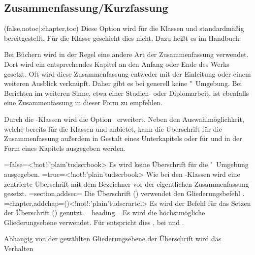 \begin{DeclareEntity*}{}
\begin{DeclareEntity*}{}
\begin{DeclareEntity*}{}
\subsection{%
  Zusammenfassung/Kurzfassung%
}
%
\begin{Declaration}
  {}
  (false,notoc|:chapter,toc)
Diese Option wird für die Klassen  und  
standardmäßig bereitgestellt. Für die Klasse  geschieht dies 
nicht. Dazu heißt es im Handbuch:
%
\begin{quoting}
Bei Büchern wird in der Regel eine andere Art der Zusammenfassung verwendet. 
Dort wird ein entsprechendes Kapitel an den Anfang oder Ende des Werks gesetzt. 
Oft wird diese Zusammenfassung entweder mit der Einleitung oder einem weiteren 
Ausblick verknüpft. Daher gibt es bei  generell keine 
"~Umgebung. Bei Berichten im weiteren Sinne, etwa einer 
Studien- oder Diplomarbeit, ist ebenfalls eine Zusammenfassung in dieser Form 
zu empfehlen.
\end{quoting}
%
Durch die \TUDScript-Klassen wird die Option~ erweitert. 
Neben den Auswahlmöglichkeit, welche bereits \KOMAScript für die Klassen 
 und  anbietet, kann die Überschrift für 
die Zusammenfassung außerdem in Gestalt eines Unterkapitels oder für 
 und  in der Form eines Kapitels 
ausgegeben werden.
%
\begin{DeclareValues}
\itemval=false=<!not!:\Class'plain'{tudscrbook}>
  Es wird keine Überschrift für die "~Umgebung ausgegeben.
\itemval*=true=<!not!:\Class'plain'{tudscrbook}>
  Wie bei den \KOMAScript-Klassen wird eine zentrierte Überschrift mit dem 
  Bezeichner  vor der eigentlichen Zusammenfassung gesetzt.
\itemval=section,addsec=
  Die Überschrift () verwendet den Gliederungsbefehl 
  .
\itemval=chapter,addchap=()<!not!:\Class'plain'{tudscrartcl}>
  Es wird der Befehl  für das Setzen der Überschrift 
  () genutzt. 
\itemval=heading=
  Es wird die höchstmögliche Gliederungsebene verwendet. Für 
   entspricht dies , bei 
   und  .
\end{DeclareValues}
%
Abhängig von der gewählten Gliederungsebene der Überschrift wird das Verhalten 

\end{Declaration}
\end{DeclareEntity*}
\end{DeclareEntity*}
\end{DeclareEntity*}
